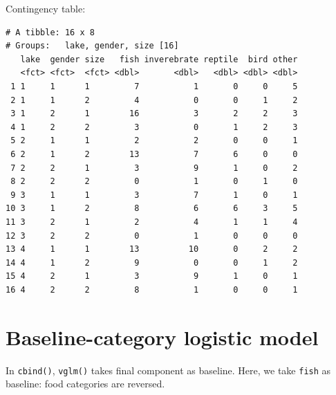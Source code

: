 \documentclass[]{book}
\newenvironment{Shaded}{\begin{snugshade}}{\end{snugshade}}
\newcommand{\KeywordTok}[1]{\textcolor[rgb]{0.13,0.29,0.53}{\textbf{#1}}}
\newcommand{\NormalTok}[1]{#1}
\newcommand{\OperatorTok}[1]{\textcolor[rgb]{0.81,0.36,0.00}{\textbf{#1}}}
\newcommand{\StringTok}[1]{\textcolor[rgb]{0.31,0.60,0.02}{#1}}
\begin{document}
Contingency table:

\begin{Shaded}
\end{Shaded}

\begin{verbatim}
# A tibble: 16 x 8
# Groups:   lake, gender, size [16]
   lake  gender size   fish inverebrate reptile  bird other
   <fct> <fct>  <fct> <dbl>       <dbl>   <dbl> <dbl> <dbl>
 1 1     1      1         7           1       0     0     5
 2 1     1      2         4           0       0     1     2
 3 1     2      1        16           3       2     2     3
 4 1     2      2         3           0       1     2     3
 5 2     1      1         2           2       0     0     1
 6 2     1      2        13           7       6     0     0
 7 2     2      1         3           9       1     0     2
 8 2     2      2         0           1       0     1     0
 9 3     1      1         3           7       1     0     1
10 3     1      2         8           6       6     3     5
11 3     2      1         2           4       1     1     4
12 3     2      2         0           1       0     0     0
13 4     1      1        13          10       0     2     2
14 4     1      2         9           0       0     1     2
15 4     2      1         3           9       1     0     1
16 4     2      2         8           1       0     0     1
\end{verbatim}

\hypertarget{baseline-category-logistic-model}{%
\section{Baseline-category logistic model}\label{baseline-category-logistic-model}}

In \texttt{cbind()}, \texttt{vglm()} takes final component as baseline. Here, we take \texttt{fish} as baseline: food categories are reversed.
\end{document}
